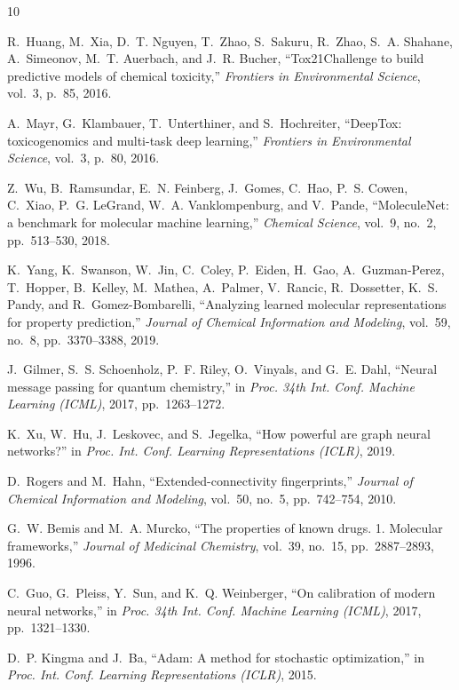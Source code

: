\documentclass[conference]{IEEEtran}
\begin{document}
\begin{thebibliography}{10}

R.~Huang, M.~Xia, D.~T. Nguyen, T.~Zhao, S.~Sakuru, R.~Zhao, S.~A. Shahane, A.~Simeonov, M.~T. Auerbach, and J.~R. Bucher,
``Tox21Challenge to build predictive models of chemical toxicity,''
\emph{Frontiers in Environmental Science}, vol.~3, p.~85, 2016.

A.~Mayr, G.~Klambauer, T.~Unterthiner, and S.~Hochreiter,
``DeepTox: toxicogenomics and multi-task deep learning,''
\emph{Frontiers in Environmental Science}, vol.~3, p.~80, 2016.

Z.~Wu, B.~Ramsundar, E.~N. Feinberg, J.~Gomes, C.~Hao, P.~S. Cowen, C.~Xiao, P.~G. LeGrand, W.~A. Vanklompenburg, and V.~Pande,
``MoleculeNet: a benchmark for molecular machine learning,''
\emph{Chemical Science}, vol.~9, no.~2, pp.~513--530, 2018.

K.~Yang, K.~Swanson, W.~Jin, C.~Coley, P.~Eiden, H.~Gao, A.~Guzman-Perez, T.~Hopper, B.~Kelley, M.~Mathea, A.~Palmer, V.~Rancic, R.~Dossetter, K.~S. Pandy, and R.~Gomez-Bombarelli,
``Analyzing learned molecular representations for property prediction,''
\emph{Journal of Chemical Information and Modeling}, vol.~59, no.~8, pp.~3370--3388, 2019.

J.~Gilmer, S.~S. Schoenholz, P.~F. Riley, O.~Vinyals, and G.~E. Dahl,
``Neural message passing for quantum chemistry,''
in \emph{Proc. 34th Int. Conf. Machine Learning (ICML)}, 2017, pp.~1263--1272.

K.~Xu, W.~Hu, J.~Leskovec, and S.~Jegelka,
``How powerful are graph neural networks?''
in \emph{Proc. Int. Conf. Learning Representations (ICLR)}, 2019.

D.~Rogers and M.~Hahn,
``Extended-connectivity fingerprints,''
\emph{Journal of Chemical Information and Modeling}, vol.~50, no.~5, pp.~742--754, 2010.

G.~W. Bemis and M.~A. Murcko,
``The properties of known drugs. 1. Molecular frameworks,''
\emph{Journal of Medicinal Chemistry}, vol.~39, no.~15, pp.~2887--2893, 1996.

C.~Guo, G.~Pleiss, Y.~Sun, and K.~Q. Weinberger,
``On calibration of modern neural networks,''
in \emph{Proc. 34th Int. Conf. Machine Learning (ICML)}, 2017, pp.~1321--1330.

D.~P. Kingma and J.~Ba,
``Adam: A method for stochastic optimization,''
in \emph{Proc. Int. Conf. Learning Representations (ICLR)}, 2015.


\end{thebibliography}
\end{document}
